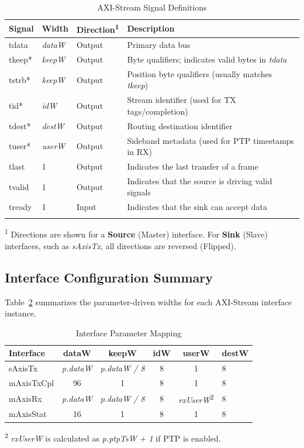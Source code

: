 \renewcommand*{\arraystretch}{1.4}
\begin{longtable}[H]{
    | p{}
    | p{}
    | p{}
    | p{} |
  }
  \hline
  \textbf{Signal} & \textbf{Width} & \textbf{Direction\textsuperscript{1}} & \textbf{Description} \\ \hline \hline
  tdata  & \textit{dataW}  & Output & Primary data bus \\ \hline
  tkeep* & \textit{keepW}  & Output & Byte qualifiers; indicates valid bytes in \textit{tdata} \\ \hline
  tstrb* & \textit{keepW}  & Output & Position byte qualifiers (usually matches \textit{tkeep}) \\ \hline
  tid* & \textit{idW}    & Output & Stream identifier (used for TX tags/completion) \\ \hline
  tdest* & \textit{destW}  & Output & Routing destination identifier \\ \hline
  tuser* & \textit{userW}  & Output & Sideband metadata (used for PTP timestamps in RX) \\ \hline
  tlast  & 1               & Output & Indicates the last transfer of a frame \\ \hline
  tvalid & 1               & Output & Indicates that the source is driving valid signals \\ \hline
  tready & 1               & Input  & Indicates that the sink can accept data \\ \hline
  \caption{AXI-Stream Signal Definitions}\label{table:axi_signals}
\end{longtable}
\small{\textsuperscript{1} Directions are shown for a \textbf{Source} (Master) interface. For \textbf{Sink} (Slave) interfaces, such as \textit{sAxisTx}, all directions are reversed (Flipped).}


\subsection{Interface Configuration Summary}
Table~\ref{table:interface_configs} summarizes the parameter-driven widths for each AXI-Stream interface instance.

\begin{table}[H]
\centering
\begin{tabular}{|l|c|c|c|c|l|}
\hline
\textbf{Interface} & \textbf{dataW} & \textbf{keepW} & \textbf{idW} & \textbf{userW} & \textbf{destW} \\ \hline
sAxisTx    & \textit{p.dataW} & \textit{p.dataW / 8} & 8 & 1 & 8 \\ \hline
mAxisTxCpl & 96 & 1 & 8 & 1 & 8 \\ \hline
mAxisRx    & \textit{p.dataW} & \textit{p.dataW / 8} & 8 & \textit{rxUserW}\textsuperscript{2} & 8 \\ \hline
mAxisStat  & 16 & 1 & 8 & 1 & 8 \\ \hline
\end{tabular}
\caption{Interface Parameter Mapping}\label{table:interface_configs}
\small{\textsuperscript{2} \textit{rxUserW} is calculated as \textit{p.ptpTsW + 1} if PTP is enabled.}
\end{table}